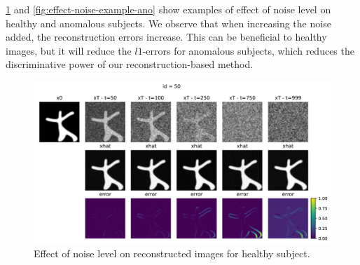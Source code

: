 \cref{fig:effect-noise-example-healthy} and \cref{fig:effect-noise-example-ano} show examples of effect of noise level on healthy and anomalous subjects. We observe that when increasing the noise added, the reconstruction errors increase. This can be beneficial to healthy images, but it will reduce the $l1$-errors for anomalous subjects, which reduces the discriminative power of our reconstruction-based method.

\begin{figure}[htbp]
    \centering
    \includegraphics[width=0.75\linewidth]{figures/effect_noise_healthy.pdf}
    \caption{Effect of noise level on reconstructed images for healthy subject.}
    \label{fig:effect-noise-example-healthy}
\end{figure}


